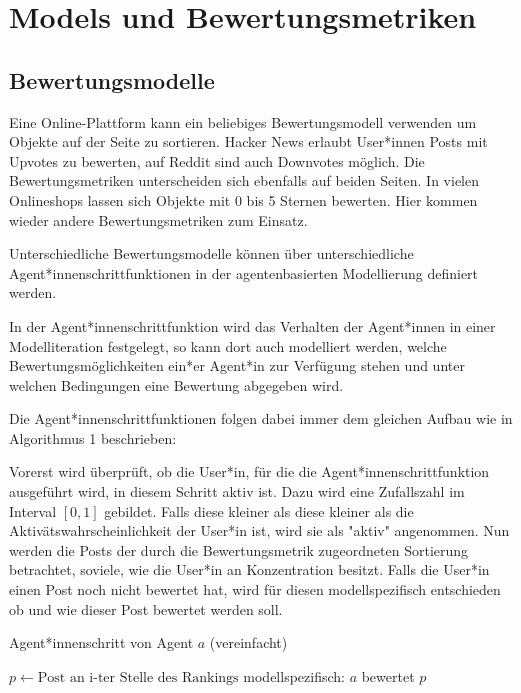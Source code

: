 \chapter{Models und Bewertungsmetriken}

\section{Bewertungsmodelle}

Eine Online-Plattform kann ein beliebiges Bewertungsmodell verwenden um Objekte auf der Seite zu sortieren. Hacker News erlaubt User*innen Posts mit Upvotes zu bewerten, auf Reddit sind auch Downvotes möglich. Die Bewertungsmetriken unterscheiden sich ebenfalls auf beiden Seiten. In vielen Onlineshops lassen sich Objekte mit 0 bis 5 Sternen bewerten. Hier kommen wieder andere Bewertungsmetriken zum Einsatz.

Unterschiedliche Bewertungsmodelle können über unterschiedliche Agent*innenschrittfunktionen in der agentenbasierten Modellierung definiert werden. 

In der Agent*innenschrittfunktion wird das Verhalten der Agent*innen in einer Modelliteration festgelegt, so kann dort auch modelliert werden, welche Bewertungsmöglichkeiten ein*er Agent*in zur Verfügung stehen und unter welchen Bedingungen eine Bewertung abgegeben wird.

Die Agent*innenschrittfunktionen folgen dabei immer dem gleichen Aufbau wie in Algorithmus 1 beschrieben:

Vorerst wird überprüft, ob die User*in, für die die Agent*innenschrittfunktion ausgeführt wird, in diesem Schritt aktiv ist. Dazu wird eine Zufallszahl im Interval $[0,1]$ gebildet. Falls diese kleiner als diese kleiner als die Aktivätswahrscheinlichkeit der User*in ist, wird sie als "aktiv" angenommen. Nun werden die Posts der durch die Bewertungsmetrik zugeordneten Sortierung betrachtet, soviele, wie die User*in an Konzentration besitzt. Falls die User*in einen Post noch nicht bewertet hat, wird für diesen modellspezifisch entschieden ob und wie dieser Post bewertet werden soll.

\begin{algorithm}
	\label{aschritt}
	\caption{Agent*innenschritt von Agent $a$ (vereinfacht)}
	\begin{algorithmic}
				\State $p\gets \text{Post an i-ter Stelle des Rankings} $
				\State modellspezifisch: $a$ bewertet $p$
				\EndIf
			\EndFor
		\EndIf
	\end{algorithmic}
\end{algorithm}

